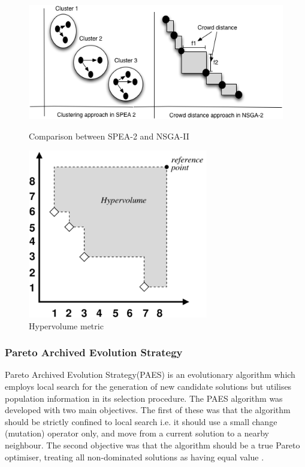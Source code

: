\documentclass[espaco=umemeio,chapter=TITLE,twoside,openright]{abnt}
\begin{document}
\begin{figure}[h]
\begin{minipage}{.6\textwidth}
\centering
\includegraphics[width=1\textwidth]{./images/speansga.png}
\caption{Comparison between SPEA-2 and NSGA-II \cite{Deb2005}}
\label{fig:speansga}
\end{minipage}
\begin{minipage}{.4\textwidth}
\centering
\includegraphics[width=0.7\textwidth]{./images/hypervolume-annot.png}
\caption{Hypervolume metric \cite{Lacour2015}}
\label{fig:hypervolume}
\end{minipage}
\end{figure}


\subsubsection{Pareto Archived Evolution Strategy} 

Pareto Archived Evolution Strategy(PAES) is an  evolutionary algorithm which employs
local search for the generation of new candidate solutions but
utilises population information in its selection procedure. The PAES algorithm was developed with two main objectives. The first of these was that the algorithm should be strictly confined to local search i.e. it should use a small change (mutation) operator only, and move from a current solution to a nearby neighbour. The second objective was that the algorithm should be a true Pareto optimiser, treating all non-dominated solutions as having equal value \cite{Knowles1999}.
\end{document}
